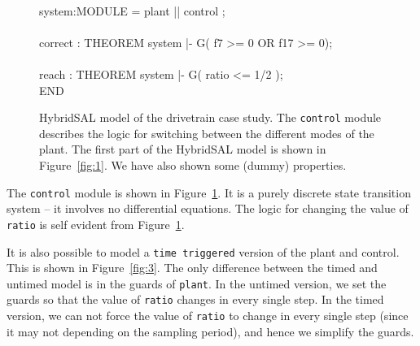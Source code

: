 \documentclass{llncs}
\begin{document}
\begin{figure}
\begin{tt}
\begin{tabbing}
\\
system:MODULE  = plant || control ;
\\

\\
correct : THEOREM
system |- G( f7 >= 0 OR f17 >= 0);
\\

\\
reach : THEOREM
system |- G( ratio <= 1/2 );
\\
END
\end{tabbing}
\end{tt}
\caption{HybridSAL model of the drivetrain case study. The {\tt{control}} module describes the
logic for switching between the different modes of the plant. The first part of the HybridSAL 
model is shown in Figure~\ref{fig:1}. We have also shown some (dummy) properties.}
\label{fig:2}
\end{figure}

The {\tt{control}} module is shown in Figure~\ref{fig:2}. It is  a purely
discrete state transition system -- it involves no differential equations.
The logic for changing the value of {\tt{ratio}} is self evident from
Figure~\ref{fig:2}.

It is also possible to model a {\tt{time triggered}} version of the 
plant and control.  This is shown in Figure~\ref{fig:3}.
The only difference between the timed and untimed model is in the guards
of {\tt{plant}}.  
In the untimed version, we set the guards so that
the value of {\tt{ratio}} changes in every single step.
In the timed version, we can not force the 
value of {\tt{ratio}} to change in every single step (since it may not
depending on the sampling period), and hence we simplify the guards.
\end{document}

